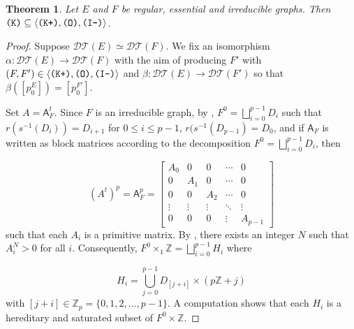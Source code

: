 \documentclass[12pt]{amsbook}%
\newtheorem{theor}{Theorem}[section]
\theoremstyle{defin}
\theoremstyle{remark}
\numberwithin{equation}{chapter}
\numberwithin{theor}{section}
\newcommand{\ZZ}{\mathbb{Z}}
\newcommand{\Asf}{\mathsf{A}}
\newcommand{\IIIm}{\mbox{\texttt{\textup{(I-)}}}}
\newcommand{\OOO}{\mbox{\texttt{\textup{(O)}}}}
\newcommand{\KKKp}{\mbox{\texttt{\textup{(K+)}}}}
\newcommand{\KKK}{\mbox{\texttt{\textup{(K)}}}}
\newcommand{\DT}{\mathcal{DT}}
\newcommand{\DQp}{\mathcal{DQ}_1}
\begin{document}
\begin{theor}\label{ImvsIp}
Let $E$ and $F$ be regular, essential and irreducible graphs. Then $\KKK\subseteq \langle\KKKp,\OOO,\IIIm\rangle$.
\end{theor}
\begin{proof}
Suppose $\DT(E)\simeq \DT(F)$. We fix an isomorphism $\alpha:\DT(E)\to\DT(F)$ with the aim of producing $F'$ with $(F,F')\in \langle\KKKp,\OOO,\IIIm\rangle$ and $\beta: \DT(E)\to\DT(F')$ so that $\beta([p^E_0])=[p^{F'}_0]$.

Set $A =\Asf_F^t$.  Since $F$ is an irreducible graph,   by \cite[Proposition~4.5.6]{dlbm:isdc}, $F^0 = \bigsqcup_{i=0}^{p-1} D_i$ such that $r(s^{-1}(D_i)) = D_{i+1}$ for $0 \leq i \leq p-1$, $r(s^{-1}(D_{p-1}) = D_0$, and if $\Asf_F$ is written as block matrices according to the decomposition $F^0 = \bigsqcup_{i=0}^{p-1} D_i$, then 

$$(A^t)^p=\Asf_F^p = \begin{bmatrix} A_0 & 0 & 0 & \cdots & 0 \\ 0 & A_1 & 0 & \cdots & 0 \\  0 & 0 & A_2 & \cdots & 0 \\ \vdots & \vdots & \vdots & \ddots & \vdots  \\ 0 & 0 & 0 & \vdots & A_{p-1} \end{bmatrix} $$
such that each $A_i $ is a primitive matrix.  By \cite[Theorem 4.5.8]{dlbm:isdc}, there exists an integer $N$ such that $A_i^N > 0$ for all $i$.  Consequently, $F^0 \times_1 \mathbb{Z} = \bigsqcup_{i=0}^{p-1}  H_i$ where 

$$H_i = \bigcup_{ j = 0}^{p-1} D_{ [j+i] } \times (p\ZZ+j)$$
with $[j+i] \in \ZZ_{p} = \{ 0 , 1, 2, \ldots, p-1\}$.  A computation shows that each $H_i$ is a hereditary and saturated subset of $F^0 \times \ZZ$.  




\end{proof}
\end{document}
